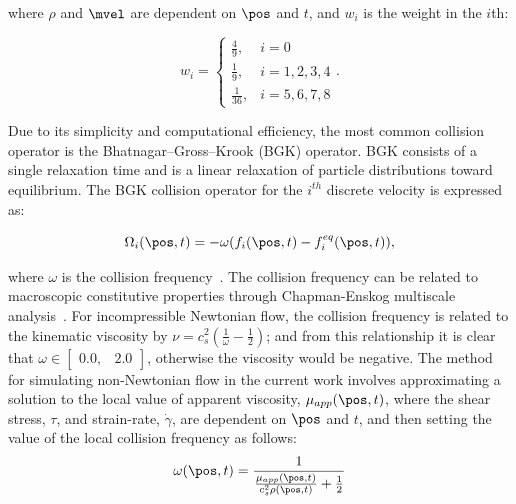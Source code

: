 \noindent where $\rho$ and $\mvel$ are dependent on $\pos$ and $t$, and $w_i$ is the weight in the $i$th:%

\begin{equation} \label{eq:weights}
w_i = \begin{cases}
    \frac{4}{9}, & i = 0 \\
    \frac{1}{9}, & i = 1, 2, 3, 4 \\
    \frac{1}{36}, & i = 5, 6, 7, 8
\end{cases}.
\end{equation}

Due to its simplicity and computational efficiency, the most common collision operator is the Bhatnagar--Gross--Krook (BGK) operator.
BGK consists of a single relaxation time and is a linear relaxation of particle distributions toward equilibrium.
The BGK collision operator for the $i^{th}$ discrete velocity is expressed as:

\begin{equation} \label{eq:bgk}
\Omega_i(\pos, t) = -\omega (f_i(\pos, t) - f_i^{eq}(\pos, t)),
\end{equation}

\noindent where $\omega$ is the collision frequency~\cite{Bha54}.
The collision frequency can be related to macroscopic constitutive properties through Chapman-Enskog multiscale analysis~\cite{wolf2000lattice}.
For incompressible Newtonian flow, the collision frequency is related to the kinematic viscosity by $\nu = c_s^2(\frac{1}{\omega} - \frac{1}{2})$; and from this relationship it is clear that $\omega \in \begin{bmatrix}0.0,& 2.0\end{bmatrix}$, otherwise the viscosity would be negative.
The method for simulating non-Newtonian flow in the current work involves approximating a solution to the local value of apparent viscosity, $\mu_{app}(\pos, t)$, where the shear stress, $\tau$, and strain-rate, $\dot{\gamma}$, are dependent on $\pos$ and $t$, and then setting the value of the local collision frequency as follows:
\begin{equation} \label{eq:colfreq-non-newtonian}
\omega(\pos, t) = \frac{1}{\frac{\mu_{app}(\pos, t)}{c_s^2 \rho(\pos, t)} + \frac{1}{2}}
\end{equation}


